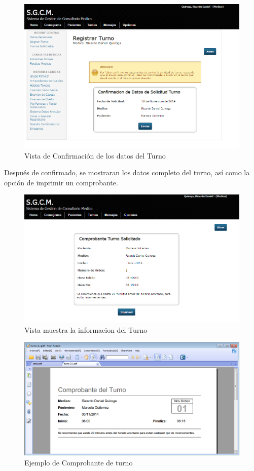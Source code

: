 \begin{figure}[H]
    \centering
    \includegraphics[scale=0.5]{resourse/confirmacion-turno.png}
    \caption{Vista de Confirmación de los datos del Turno}
    \label{fig:623}
\end{figure}

Después de confirmado, se mostraran los datos completo del turno, así como la opción de imprimir un comprobante.


\begin{figure}[H]
    \centering
    \includegraphics[scale=0.5]{resourse/datos-turno.png}
    \caption{Vista muestra la informacion del Turno}
    \label{fig:624}
\end{figure}


\begin{figure}[H]
    \centering
    \includegraphics[scale=0.5]{resourse/comprobante-turno.png}
    \caption{Ejemplo de Comprobante de turno}
    \label{fig:625}
\end{figure}

